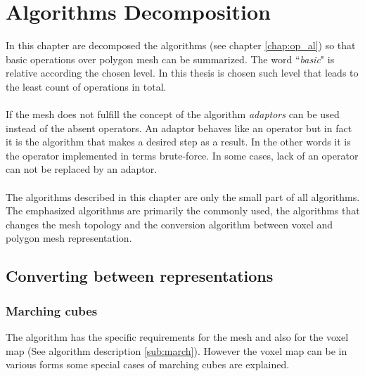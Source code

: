 \chapter{Algorithms Decomposition}

In this chapter are decomposed the algorithms (see chapter \ref{chap:op_al}) so that basic
operations over polygon
mesh can be summarized. The word ``\emph{basic}" is relative according the chosen level.
In this thesis is chosen such level that leads to the least count of operations in total.\\
\\
If the mesh does not fulfill the concept of the algorithm \emph{adaptors} can be used instead
of the absent operators. An adaptor behaves like an operator but in fact it is the algorithm that
makes a desired step as a result. In the other words it is the operator implemented in terms
brute-force. In some cases, lack of an operator can not be replaced by an adaptor.\\
\\
The algorithms described in this chapter are only the small part of all algorithms. The emphasized
algorithms are primarily the commonly used, the algorithms that changes the mesh topology and
the conversion algorithm between voxel and polygon mesh representation.

\section{Converting between representations}

\subsection{Marching cubes}

The algorithm has the specific requirements for the mesh and also for the voxel map (See algorithm
description \ref{sub:march}). However the voxel map can be in various forms some special cases
of marching cubes are explained.

